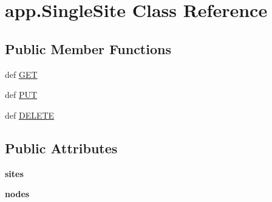 \hypertarget{classapp_1_1_single_site}{\section{app.\+Single\+Site Class Reference}
\label{classapp_1_1_single_site}
}
\subsection*{Public Member Functions}
\begin{DoxyCompactItemize}
\item 
def \hyperlink{classapp_1_1_single_site_a79c32b0f08572a91af1ae9920221039a}{G\+E\+T}
\item 
def \hyperlink{classapp_1_1_single_site_a4ae788842f4a486dfaf5d6efbae8f460}{P\+U\+T}
\item 
def \hyperlink{classapp_1_1_single_site_a335949a36075d9fd5d1709dd521a498c}{D\+E\+L\+E\+T\+E}
\end{DoxyCompactItemize}
\subsection*{Public Attributes}
\begin{DoxyCompactItemize}
\item 
\hypertarget{classapp_1_1_single_site_a3e6252ac45eea3871832353a96bf29a2}{{\bfseries sites}}\label{classapp_1_1_single_site_a3e6252ac45eea3871832353a96bf29a2}

\item 
\hypertarget{classapp_1_1_single_site_a0237fb9050d9c2d5a443a11a21c89635}{{\bfseries nodes}}\label{classapp_1_1_single_site_a0237fb9050d9c2d5a443a11a21c89635}

\end{DoxyCompactItemize}


